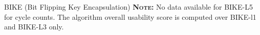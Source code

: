 \begin{algorithmbox}{BIKE (Bit Flipping Key Encapsulation)}
    {\tiny  {\bfseries \scshape Note:} No data available for BIKE-L5 for cycle counts. The algorithm overall usability score is computed over BIKE-l1 and BIKE-L3 only.}
\end{algorithmbox}
